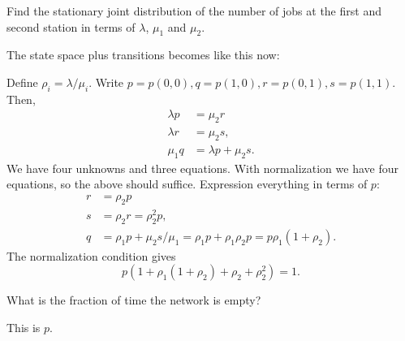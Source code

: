 \begin{exercise}[201706]
  Find the stationary joint distribution of the number of jobs at the first
  and second station in terms of $\lambda$, $\mu_1$ and $\mu_2$.
\begin{solution}
The state space plus transitions becomes like this now:



Define $\rho_i=\lambda/\mu_i$. Write $p=p(0,0), q=p(1,0), r=p(0,1), s=p(1,1)$. Then,
  \begin{align*}
     \lambda p &= \mu_2 r \\
     \lambda r &= \mu_2 s,\\
     \mu_1 q &= \lambda p + \mu_2 s.
  \end{align*}
We have four unknowns and three equations. With normalization we have four equations, so the above should  suffice.  Expression everything in terms of $p$: 
  \begin{align*}
     r &= \rho_2 p \\
     s &= \rho_2 r = \rho_2^2 p,\\
     q &= \rho_1 p + \mu_2 s/\mu_1 = \rho_1 p + \rho_1\rho_2 p = p \rho_1 (1+\rho_2).
  \end{align*}
The normalization condition gives
\begin{equation*}
  p(1+\rho_1(1+\rho_2) + \rho_2 + \rho_2^2) = 1.
\end{equation*}

\end{solution}
\end{exercise}

\begin{exercise}[201706]
What is the fraction of time the network is empty? %
\begin{solution}
This is $p$. 
\end{solution}
\end{exercise}

